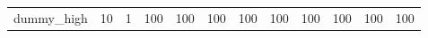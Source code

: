 \begin{tabular}{llllllllllll}
dummy_high & {\cellcolor[HTML]{E9F7FA}} \color[HTML]{000000} 10 & {\cellcolor[HTML]{F6FCFD}} \color[HTML]{000000} 1 & {\cellcolor[HTML]{00441B}} \color[HTML]{F1F1F1} 100 & {\cellcolor[HTML]{00441B}} \color[HTML]{F1F1F1} 100 & {\cellcolor[HTML]{00441B}} \color[HTML]{F1F1F1} 100 & {\cellcolor[HTML]{00441B}} \color[HTML]{F1F1F1} 100 & {\cellcolor[HTML]{00441B}} \color[HTML]{F1F1F1} 100 & {\cellcolor[HTML]{00441B}} \color[HTML]{F1F1F1} 100 & {\cellcolor[HTML]{00441B}} \color[HTML]{F1F1F1} 100 & {\cellcolor[HTML]{00441B}} \color[HTML]{F1F1F1} 100 & {\cellcolor[HTML]{00441B}} \color[HTML]{F1F1F1} 100 \\
\end{tabular}
